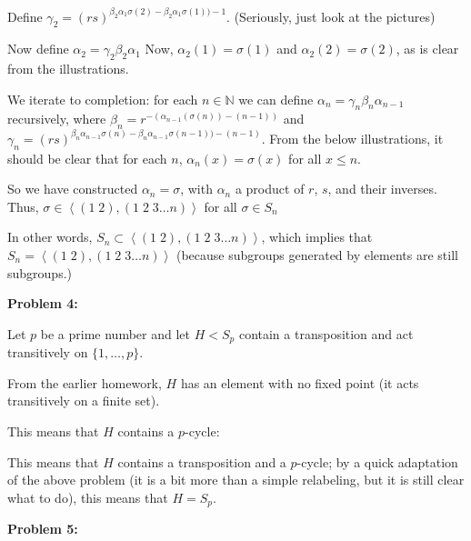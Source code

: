 \documentclass[a4paper,12pt]{article}
\newcommand{\tab}{\hspace{4mm}} %
\newcommand{\shunt}{\vspace{20mm}}
\newcommand{\anbrack}[1]{\left\langle #1 \right\rangle}
\newcommand{\al}{\alpha} %
\newcommand{\be}{\beta}
\newcommand{\ga}{\gamma}
\newcommand{\N}{\mathbb{N}}
\begin{document}
\shunt %

\shunt

\tab Define $\ga_2 = (rs)^{\be_2\al_1\sigma(2)-\be_2\al_1\sigma(1)) -1}$. (Seriously, just look at the pictures)

\shunt %

\shunt

\tab Now define $\al_2 = \ga_2\be_2\al_1$ Now, $\al_2(1) = \sigma(1)$ and $\al_2(2) = \sigma(2)$, as is clear from the illustrations.

\tab We iterate to completion: for each $n \in \N$ we can define $\al_n = \ga_n\be_n\al_{n-1}$ recursively, where $\be_n = r^{-(\al_{n-1}(\sigma(n))-(n-1))}$ and $\ga_n = (rs)^{\be_n\al_{n-1}\sigma(n)-\be_n\al_{n-1}\sigma(n-1)) -(n-1)}$. From the below illustrations, it should be clear that for each $n$, $\al_n(x) = \sigma(x)$ for all $x \leq n$.

\shunt %

\shunt

\tab So we have constructed $\al_n = \sigma$, with $\al_n$ a product of $r$, $s$, and their inverses. Thus, $\sigma \in \anbrack{(1 \; 2) , (1 \; 2 \; 3 \ldots n)}$ for all $\sigma \in S_n$

In other words, $S_n \subset \anbrack{(1 \; 2) , (1 \; 2 \; 3 \ldots n)}$, which implies that $S_n = \anbrack{(1 \; 2) , (1 \; 2 \; 3 \ldots n)}$ (because subgroups generated by elements are still subgroups.)

\shunt

{\bf Problem 4:}

Let $p$ be a prime number and let $H<S_p$ contain a transposition and act transitively on $\{1,\ldots,p\}$.

From the earlier homework, $H$ has an element with no fixed point (it acts transitively on a finite set).

This means that $H$ contains a $p$-cycle:

\tab %

This means that $H$ contains a transposition and a $p$-cycle; by a quick adaptation of the above problem (it is a bit more than a simple relabeling, but it is still clear what to do), this means that $H = S_p$.

\shunt

{\bf Problem 5:}
\end{document}
